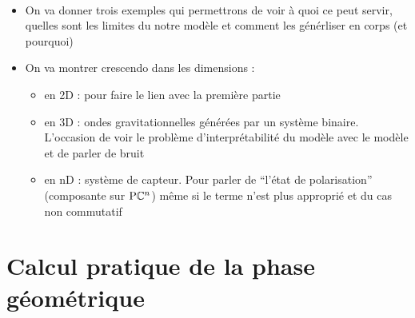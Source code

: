 
\\
\begin{itemize}
	\item On va donner trois exemples qui permettrons de voir à quoi ce peut servir, quelles sont les limites du notre modèle et comment les générliser en corps (et pourquoi)
	
	\item On va montrer crescendo dans les dimensions :\begin{itemize}
		
		\item en 2D  : pour faire le lien avec la première partie
		
		\item en 3D : ondes gravitationnelles générées par un système binaire. L'occasion de voir le problème d'interprétabilité du modèle avec le modèle et de parler de bruit
		
		\item en nD : système de capteur. Pour parler de ``l'état de polarisation'' (composante sur $\text{\normalfont P}\mathbb{C}^{n}$) même si le terme n'est plus approprié et du cas non commutatif
	\end{itemize}
\end{itemize}




\section{\todo Calcul pratique de la phase géométrique}

